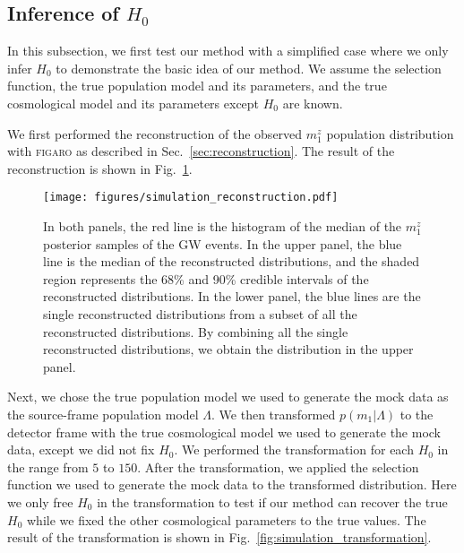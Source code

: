 \documentclass[twocolumn]{aastex631}
\begin{document}
\subsection{Inference of $H_0$}
\label{sec:inference_H0}

In this subsection, we first test our method with a simplified case where we only infer $H_0$ to demonstrate the basic idea of our method.
We assume the selection function, the true population model and its parameters, and the true cosmological model and its parameters except $H_0$ are known.

We first performed the reconstruction of the observed $m^z_1$ population distribution with \textsc{figaro} as described in Sec.~\ref{sec:reconstruction}.
The result of the reconstruction is shown in Fig.~\ref{fig:simulation_reconstruction}.

\begin{figure}[h]
    \texttt{[image: figures/simulation\_reconstruction.pdf]}
    \caption{
        In both panels, the red line is the histogram of the median of the $m^z_1$ posterior samples of the \ac{GW} events.
        In the upper panel, the blue line is the median of the reconstructed distributions, and the shaded region represents the 68\% and 90\% credible intervals of the reconstructed distributions.
        In the lower panel, the blue lines are the single reconstructed distributions from a subset of all the reconstructed distributions.
        By combining all the single reconstructed distributions, we obtain the distribution in the upper panel.
    }
    \label{fig:simulation_reconstruction}
\end{figure}

Next, we chose the true population model we used to generate the mock data as the source-frame population model $\Lambda$.
We then transformed $p(m_1|\Lambda)$ to the detector frame with the true cosmological model we used to generate the mock data, except we did not fix $H_0$.
We performed the transformation for each $H_0$ in the range from $5$ to $150$.
After the transformation, we applied the selection function we used to generate the mock data to the transformed distribution.
Here we only free $H_0$ in the transformation to test if our method can recover the true $H_0$ while we fixed the other cosmological parameters to the true values.
The result of the transformation is shown in Fig.~\ref{fig:simulation_transformation}.
\end{document}
